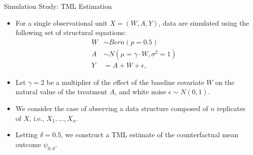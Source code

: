 \documentclass{beamer}
\begin{document}
\begin{frame}[c]{Simulation Study: TML Estimation}

\begin{center}
\begin{itemize}
  \itemsep6pt
  \item For a single observational unit $X = (W, A, Y)$, data are simulated
    using the following set of structural equations:
    \begin{align*}
      W & \sim Bern(p = 0.5)\\
      A & \sim N(\mu = \gamma \cdot W, \sigma^2 = 1)\\
      Y & = A + W + \epsilon,
     \end{align*}
   \item Let $\gamma = 2$ be a multiplier of the effect of the baseline
     covariate $W$ on the natural value of the treatment $A$, and white noise
     $\epsilon \sim N(0, 1)$.
   \item We consider the case of observing a data structure composed of $n$
     replicates of $X$, i.e., $X_1, \ldots, X_n$.
   \item Letting $\delta = 0.5$, we construct a TML estimate of the
     counterfactual mean outcome $\psi_{0, d}$.
\end{itemize}
\end{center}


\end{frame}

\end{document}
